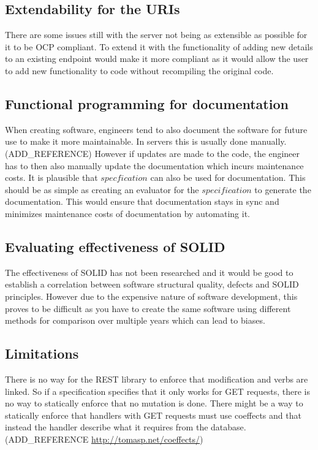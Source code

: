 \subsection{Extendability for the URIs}

There are some issues still with the server not being as extensible as possible
for it to be OCP compliant. To extend it with the functionality of adding new
details to an existing endpoint would make it more compliant as it would allow
the user to add new functionality to code without recompiling the original
code. 

\subsection{Functional programming for documentation}

When creating software, engineers tend to also document the software for future
use to make it more maintainable. In servers this is usually done manually.
(ADD\_REFERENCE) However if updates are made to the code, the engineer has to
then also manually update the documentation which incurs maintenance costs. It
is plausible that $specfication$ can also be used for documentation. This
should be as simple as creating an evaluator for the $specification$ to
generate the documentation. This would ensure that documentation stays in sync
and minimizes maintenance costs of documentation by automating it.

\subsection{Evaluating effectiveness of SOLID}

The effectiveness of SOLID has not been researched and it would be good to
establish a correlation between software structural quality, defects and SOLID
principles. However due to the expensive nature of software development, this
proves to be difficult as you have to create the same software using different
methods for comparison over multiple years which can lead to biases.

\subsection{Limitations}

There is no way for the REST library to enforce that modification and verbs are
linked. So if a specification specifies that it only works for GET requests,
there is no way to statically enforce that no mutation is done. There might be a
way to statically enforce that handlers with GET requests must use coeffects and
that instead the handler describe what it requires from the
database.(ADD\_REFERENCE \url{http://tomasp.net/coeffects/})


